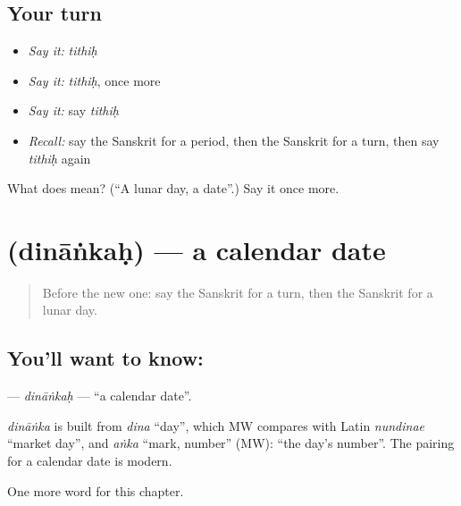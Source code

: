\subsection*{Your turn}
\begin{itemize}
\raggedright
  \item \emph{Say it:} \emph{tithiḥ}
  \item \emph{Say it:} \emph{tithiḥ}, once more
  \item \emph{Say it:} say \emph{tithiḥ}
  \item \emph{Recall:} say the Sanskrit for a period, then the Sanskrit for a turn, then say \emph{tithiḥ} again
\end{itemize}

\begin{tcolorbox}[breakable,colback=teal!4,colframe=teal!35!black,title={Before you move on}]
What does  mean? (\textquotedblleft{}A lunar day, a date\textquotedblright{}.) Say it once more.
\end{tcolorbox}
\section[\texorpdfstring{\sk{दिनांकः} (dināṅkaḥ)}{दिनांकः (dināṅkaḥ)}]{ (dināṅkaḥ) — a calendar date}

\label{lesson:SA-C152-dinankah}



\begin{quote}
Before the new one: say the Sanskrit for a turn, then the Sanskrit for a lunar day.
\end{quote}

\subsection*{You'll want to know: }
\textbf{} — \emph{dināṅkaḥ} — \textquotedblleft{}a calendar date\textquotedblright{}.

\begin{cousinweb}
\emph{dināṅka} is built from \emph{dina} \textquotedblleft{}day\textquotedblright{}, which MW compares with Latin \emph{nundinae} \textquotedblleft{}market day\textquotedblright{}, and \emph{aṅka} \textquotedblleft{}mark, number\textquotedblright{} (MW): \textquotedblleft{}the day's number\textquotedblright{}. The pairing for a calendar date is modern.
\end{cousinweb}

\begin{grammarlens}[title={What you've built}]
One more word for this chapter.
\end{grammarlens}

